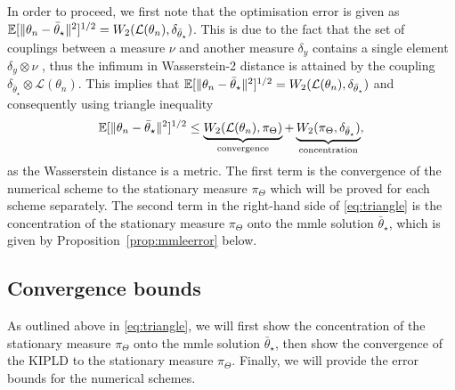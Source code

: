 In order to proceed, we first note that the optimisation error is given as ${\mathbb E}[\|\theta_n - \bar{\theta}_\star\|^2]^{1/2} = W_2(\mathcal{L}(\theta_n), \delta_{\bar{\theta}_\star})$. This is due to the fact that the set of couplings between a measure $\nu$ and another measure $\delta_y$ contains a single element $\delta_y \otimes \nu$ \citep[Section~1.4]{santambrogio2015optimal}, thus the infimum in Wasserstein-2 distance is attained by the coupling $\delta_{\bar{\theta}_\star} \otimes \mathcal{L}(\theta_n)$. This implies that ${\mathbb E}[\|\theta_n - \bar{\theta}_\star\|^2]^{1/2} = W_2(\mathcal{L}(\theta_n), \delta_{\bar{\theta}_\star})$ and consequently using triangle inequality
\small
\begin{align}
{\mathbb E}[\|\theta_n - \bar{\theta}_\star\|^2]^{1/2} \leq \underbrace{W_2(\mathcal{L}(\theta_n), \pi_\Theta)}_{\textnormal{convergence}}  + \underbrace{W_2(\pi_\Theta, \delta_{\bar{\theta}_\star})}_{\textnormal{concentration}},\label{eq:triangle}
\end{align}
\normalsize
as the Wasserstein distance is a metric. The first term is the convergence of the numerical scheme to the stationary measure $\pi_\Theta$ which will be proved for each scheme separately. The second term in the right-hand side of \eqref{eq:triangle} is the concentration of the stationary measure $\pi_\Theta$ onto the \gls*{mmle} solution $\bar{\theta}_\star$, which is given by Proposition~\ref{prop:mmleerror} below.

\subsection{Convergence bounds}\label{sec:conv}
As outlined above in \eqref{eq:triangle}, we will first show the concentration of the stationary measure $\pi_\Theta$ onto the \gls*{mmle} solution $\bar{\theta}_\star$, then show the convergence of the KIPLD to the stationary measure $\pi_\Theta$. Finally, we will provide the error bounds for the numerical schemes.

